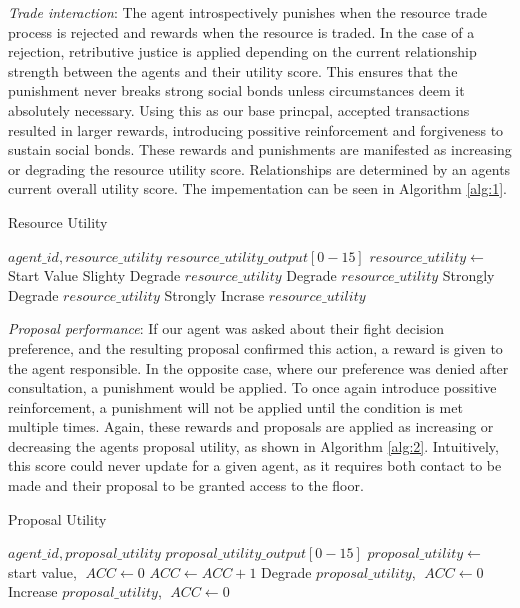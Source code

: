 \textit{Trade interaction}: The agent introspectively punishes when the resource trade process is rejected and rewards when the resource is traded. In the case of a rejection, retributive justice is applied depending on the current relationship strength between the agents and their utility score. This ensures that the punishment never breaks strong social bonds unless circumstances deem it absolutely necessary. Using this as our base princpal, accepted transactions resulted in larger rewards, introducing possitive reinforcement and forgiveness to sustain social bonds. These rewards and punishments are manifested as increasing or degrading the resource utility score. Relationships are determined by an agents current overall utility score. The impementation can be seen in Algorithm \ref{alg:1}. 

\begin{algorithm}[htb]
    \caption{Resource Utility}\label{alg:1}
    \begin{algorithmic} 
    \scriptsize
    \Require $agent\_id, resource\_utility$
    \Ensure $resource\_utility\_output[0-15]$
    \State $resource\_utility \leftarrow $ Start Value
    \EndIf
    \State Slighty Degrade $resource\_utility$ 
    \EndIf
    \State Degrade $resource\_utility$
    \Else
    \State Strongly Degrade $resource\_utility$
    \EndIf
    \EndIf
    \State Strongly Incrase $resource\_utility$ 
    \EndIf
    \end{algorithmic}
    \end{algorithm}



\textit{Proposal performance}: If our agent was asked about their fight decision preference, and the resulting proposal confirmed this action, a reward is given to the agent responsible. In the opposite case, where our preference was denied after consultation, a punishment would be applied. To once again introduce possitive reinforcement, a punishment will not be applied until the condition is met multiple times. Again, these rewards and proposals are applied as increasing or decreasing the agents proposal utility, as shown in Algorithm \ref{alg:2}. Intuitively, this score could never update for a given agent, as it requires both contact to be made and their proposal to be granted access to the floor. 

\begin{algorithm}[htb]
\caption{Proposal Utility}\label{alg:2}
\begin{algorithmic} 
\scriptsize
\Require $agent\_id, proposal\_utility$
\Ensure $proposal\_utility\_output[0-15]$
\State $proposal\_utility \leftarrow$ start value, $\; ACC \leftarrow 0$
\EndIf
{}
\State $ACC \leftarrow ACC+1$
\State Degrade $proposal\_utility$, $\; ACC \leftarrow 0$
\EndIf
\EndIf
{}
\State Increase $proposal\_utility$, $\; ACC \leftarrow 0$
\EndIf
\end{algorithmic}
\end{algorithm}


